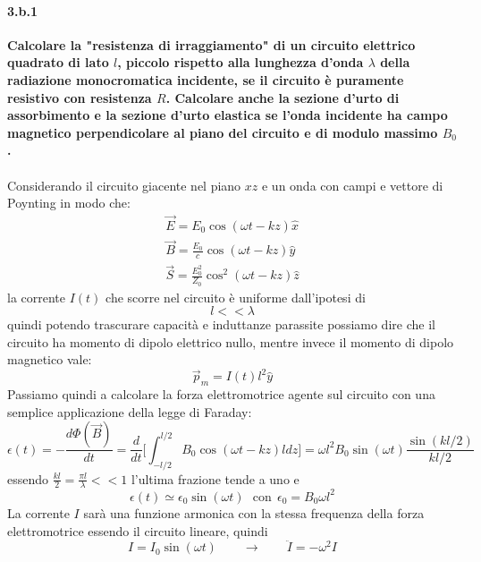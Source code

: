\documentclass[twoside]{article}
\begin{document}
\paragraph{3.b.1}\textbf{Calcolare la "resistenza di irraggiamento" di un circuito elettrico quadrato di lato $l$, piccolo rispetto alla lunghezza d'onda $\lambda$ della radiazione monocromatica incidente, se il circuito è puramente resistivo con resistenza $R$. Calcolare anche la sezione d'urto di assorbimento e la sezione d'urto elastica se l'onda incidente ha campo magnetico perpendicolare al piano del circuito e di modulo massimo $B_0$.}\\
\\
Considerando il circuito giacente nel piano $xz$ e un onda con campi e vettore di Poynting in modo che:
\begin{align}
    \vec{E}=E_0\cos(\omega t-kz)\hat{x}\\
    \vec{B}=\frac{E_0}{c}\cos(\omega t-kz)\hat{y}\\
    \vec{S}=\frac{E_0^2}{Z_0}\cos^2(\omega t-kz)\hat{z}
\end{align}
la corrente $I(t)$ che scorre nel circuito è uniforme dall'ipotesi di \begin{equation*}
    l<<\lambda
\end{equation*}
quindi potendo trascurare capacità e induttanze parassite possiamo dire che il circuito ha momento di dipolo elettrico nullo, mentre invece il momento di dipolo magnetico vale:
\begin{equation}
    \vec{p}_m=I(t)l^2\hat{y}
\end{equation}
Passiamo quindi a calcolare la forza elettromotrice agente sul circuito con una semplice applicazione della legge di Faraday:
\begin{equation}
    \epsilon(t)=-\frac{d\Phi(\vec{B})}{dt}=\frac{d}{dt}\Biggl[\int_{-l/2}^{l/2}B_0\cos(\omega t-kz)ldz\Biggr]=\omega l^2B_0\sin(\omega t)\frac{\sin(kl/2)}{kl/2}
\end{equation}
essendo $\frac{kl}{2}=\frac{\pi l}{\lambda}<<1$ l'ultima frazione tende a uno e 
\begin{equation}
    \epsilon(t)\simeq\epsilon_0\sin(\omega t)\ \ \ \text{con}\ \  \epsilon_0=B_0\omega l^2
\end{equation}
La corrente $I$ sarà una funzione armonica con la stessa frequenza della forza elettromotrice essendo il circuito lineare, quindi
\begin{equation}
    I=I_0\sin(\omega t)\qquad\rightarrow\qquad\ddot{I}=-\omega^2I
\end{equation}
\end{document}
